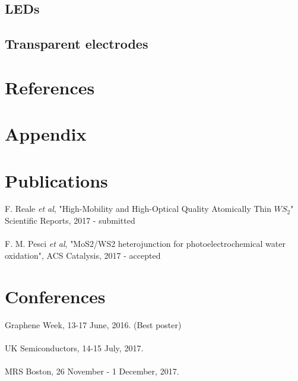 \documentclass[12pt]{article}
\begin{document}
	\subsection{LEDs}
	\subsection{Transparent electrodes}
	
\section*{References}
\section*{Appendix}

\section*{Publications}

F. Reale \textit{et al}, "High-Mobility and High-Optical Quality Atomically Thin $WS_2$" Scientific Reports, 2017 - submitted\\ \\
F. M. Pesci \textit{et al}, "MoS2/WS2 heterojunction for photoelectrochemical water oxidation", ACS Catalysis, 2017 - accepted

\section*{Conferences}

Graphene Week, 13-17 June, 2016. (Best poster)\\ \\
UK Semiconductors, 14-15 July, 2017.\\ \\
MRS Boston, 26 November - 1 December, 2017.


{}
\end{document}
